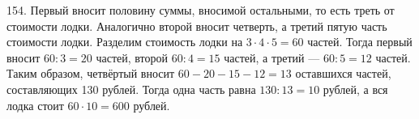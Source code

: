 154. Первый вносит половину суммы, вносимой остальными, то есть треть от стоимости лодки. Аналогично второй вносит четверть, а третий пятую часть стоимости лодки.
Разделим стоимость лодки на $3\cdot4\cdot5=60$ частей. Тогда первый вносит $60:3=20$ частей, второй $60:4=15$ частей, а третий --- $60:5=12$ частей. Таким образом, четвёртый вносит $60-20-15-12=13$ оставшихся частей, составляющих 130 рублей. Тогда одна часть равна $130:13=10$ рублей, а вся лодка стоит $60\cdot10=600$ рублей.\\
